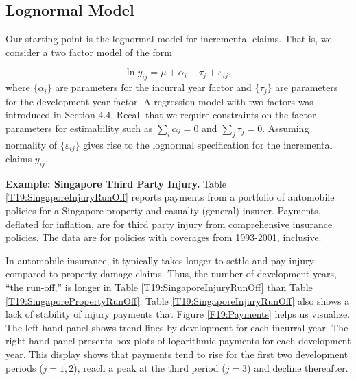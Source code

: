 \subsection{Lognormal Model}

Our starting point is the lognormal model for incremental claims.
That is, we consider a two factor model of the form

\begin{equation}\label{E19:LogNormal}
\ln y_{ij} = \mu + \alpha_i + \tau_j + \varepsilon_{ij},
\end{equation}
where $\{ \alpha_i \}$ are parameters for the incurral year factor
and $\{ \tau_j \}$ are parameters for the development year factor. A
regression model with two factors was introduced in Section 4.4.
Recall that we require constraints on the factor parameters for
estimability such as $\sum_i \alpha_i = 0$ and $\sum_j \tau_j= 0$.
Assuming normality of $\{\varepsilon_{ij} \}$ gives rise to the
lognormal specification for the incremental claims $y_{ij}$.

\linejed{}

\textbf{Example: Singapore Third Party
Injury.} Table
\ref{T19:SingaporeInjuryRunOff} reports payments from a portfolio of
automobile policies for a Singapore property and casualty (general)
insurer. Payments, deflated for inflation, are for third party
injury from comprehensive insurance policies. The data are for
policies with coverages from 1993-2001, inclusive.


In automobile insurance, it typically takes longer to settle and pay
injury compared to property damage claims. Thus, the number of
development years, ``the run-off,'' is longer  in Table
\ref{T19:SingaporeInjuryRunOff} than Table
\ref{T19:SingaporePropertyRunOff}. Table
\ref{T19:SingaporeInjuryRunOff} also shows a lack of stability of
injury payments that Figure \ref{F19:Payments} helps us visualize.
The left-hand panel shows trend lines by development for each
incurral year. The right-hand panel presents box plots of
logarithmic payments for each development year. This display shows
that payments tend to rise for the first two development periods
($j=1,2$), reach a peak at the third period ($j=3$) and decline
thereafter.



